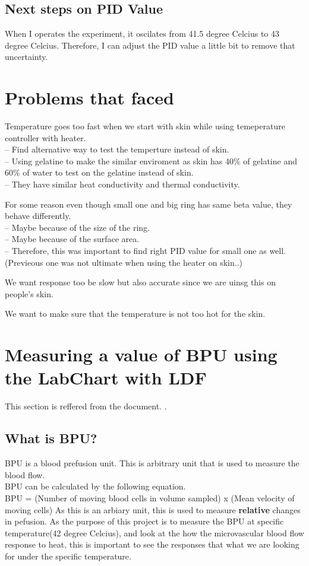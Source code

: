 \documentclass{article}
\begin{document}
\subsection{Next steps on PID Value}
When I operates the experiment, it oscilates from 41.5 degree Celcius to 43 degree Celcius. 
Therefore, I can adjust the PID value a little bit to remove that uncertainty.

\section{Problems that faced}
\itemize
\item Temperature goes too fast when we start with skin while using temeperature controller with heater. \\
-- Find alternative way to test the temperture instead of skin. \\
-- Using gelatine to make the similar enviroment as skin has 40\% of gelatine and 60\% of water to test on the gelatine instead of skin. \\
-- They have similar heat conductivity and thermal conductivity. \\
\item For some reason even though small one and big ring has same beta value, they behave differently. \\
-- Maybe because of the size of the ring. \\
-- Maybe because of the surface area. \\
-- Therefore, this was important to find right PID value for small one as well. (Previeous one was not ultimate when using the heater on skin..) \\
\item We want response too be slow but also accurate since we are uinsg this on people's skin.
\item We want to make sure that the temperature is not too hot for the skin.

\section{Measuring a value of BPU using the LabChart with LDF}
This section is reffered from the document. \cite{biopac-ldf}\hyperref[biopac-ldf]{}. 
\subsection{What is BPU?}
BPU is a blood prefusion unit. This is arbitrary unit that is used to measure the blood flow. \\
BPU can be calculated by the following equation. \\
BPU = (Number of moving blood cells in volume sampled) x (Mean velocity of moving cells)
As this is an arbiary unit, this is used to measure \textbf{relative} changes in pefusion.  
As the purpose of this project is to measure the BPU at specific temperature(42 degree Celcius), 
and look at the how the microvascular blood flow response to heat, this is important to 
see the responses that what we are looking for under the specific temperature.
\end{document}
